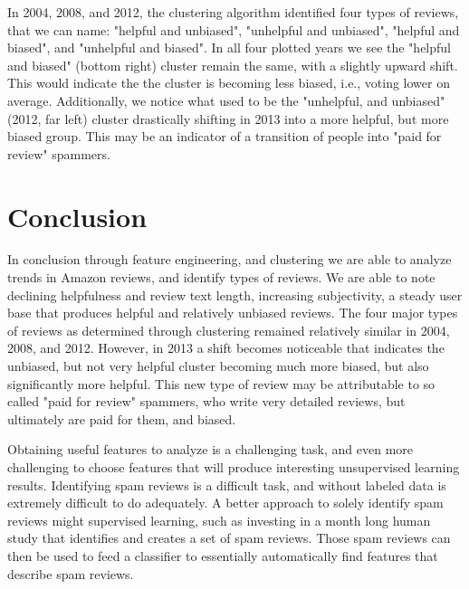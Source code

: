 \documentclass[journal, a4paper]{IEEEtran}
\begin{document}
In 2004, 2008, and 2012, the clustering algorithm identified four types of reviews, that we can name: "helpful and unbiased", "unhelpful and unbiased", "helpful and biased", and "unhelpful and biased". In all four plotted years we see the "helpful and biased" (bottom right) cluster remain the same, with a slightly upward shift. This would indicate the the cluster is becoming less biased, i.e., voting lower on average. Additionally, we notice what used to be the "unhelpful, and unbiased" (2012, far left) cluster drastically shifting in 2013 into a more helpful, but more biased group. This may be an indicator of a transition of people into "paid for review" spammers.


\section{Conclusion}
In conclusion through feature engineering, and clustering we are able to analyze trends in Amazon reviews, and identify types of reviews. We are able to note declining helpfulness and review text length, increasing subjectivity, a steady user base that produces helpful and relatively unbiased reviews. The four major types of reviews as determined through clustering remained relatively similar in 2004, 2008, and 2012. However, in 2013 a shift becomes noticeable that indicates the unbiased, but not very helpful cluster becoming much more biased, but also significantly more helpful. This new type of review may be attributable to so called "paid for review" spammers, who write very detailed reviews, but ultimately are paid for them, and biased.

Obtaining useful features to analyze is a challenging task, and even more challenging to choose features that will produce interesting unsupervised learning results. Identifying spam reviews is a difficult task, and without labeled data is extremely difficult to do adequately. A better approach to solely identify spam reviews might supervised learning, such as investing in a month long human study that identifies and creates a set of spam reviews. Those spam reviews can then be used to feed a classifier to essentially automatically find features that describe spam reviews.
\end{document}
